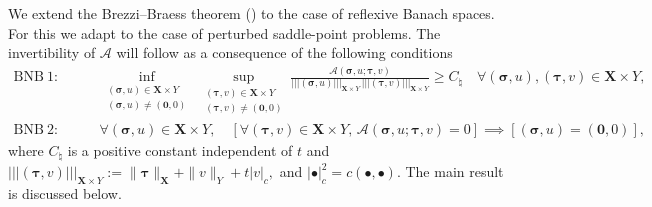 \documentclass[11pt, reqno, a4paper, twoside]{article}
\newcommand*\tnorm[1]{|\!|\!| #1 |\!|\!|}
\newcommand\bsigma{\boldsymbol{\sigma}}
\newcommand\bzero{\boldsymbol{0}}
\newcommand\btau{\boldsymbol{\tau}}
\newcommand{\bX}{\mathbf{X}}
\newcommand{\cA}{\mathcal{A}}
\numberwithin{equation}{section}
\numberwithin{remark}{section}
\numberwithin{figure}{section}
\numberwithin{table}{section}
\newcommand{\rrb}[1]{{\leavevmode\color{lightgreen}{#1}}}
\begin{document}
We extend the Brezzi--Braess theorem (\cite[Theorem~2.1]{boon2021robust}) to the case of reflexive Banach spaces. For this we adapt  \cite[Theorem~49.15]{ern2021galerkin} to the case of perturbed saddle-point problems. The invertibility of $\cA$ will follow as a consequence of the following conditions
\begin{subequations}
   \begin{align}
\mathrm{BNB~1:}\qquad&\inf_{\substack{(\bsigma,u)\in\bX\times Y \\ (\bsigma,u)\neq(\bzero,0)}}
\ \sup_{\substack{(\btau,v)\in\bX\times Y \\ (\btau,v)\neq(\bzero,0)}}
\frac{\cA(\bsigma,u;\btau,v)}
     {\tnorm{(\bsigma,u)}_{\bX\times Y}\,
      \tnorm{(\btau,v)}_{\bX\times Y}}
 \geq C_{\natural} \quad \forall (\bsigma,u),(\btau,v)\in\bX\times Y,\\
\mathrm{BNB~2:}\qquad& \forall(\bsigma,u)\in\bX\times Y, \quad [\forall (\btau,v)\in\bX\times Y,\, \cA(\bsigma,u;\btau,v)=0]\implies[(\bsigma,u)={(\bzero, 0)}]\label{eq:BNB2},
\end{align}\end{subequations}
where \(C_{\natural}\) is a positive constant independent of \(t\) and {\(\tnorm{(\btau,v)}_{\bX\times Y}:=\|\btau\|_{\bX}+\|v\|_{Y}+t|v|_c,\) and \(|\bullet|^2_c={c(\bullet,\bullet)}\)}.
%
The main result is discussed below. 
\end{document}
